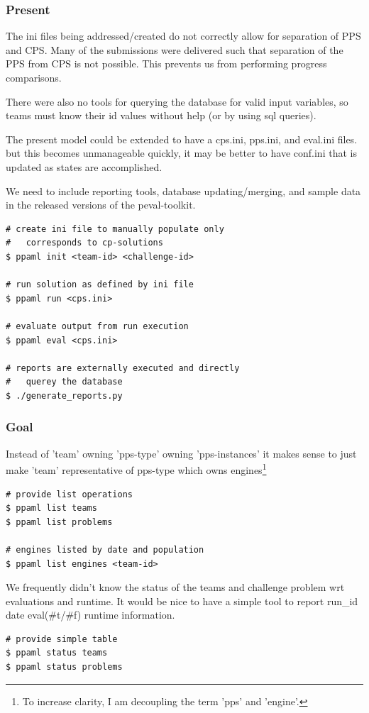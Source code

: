 \documentclass[11pt]{article} %
\def\ptk{peval-toolkit\xspace}
\begin{document}
\begin{multicols}{2}
  \subsubsection*{Present}
  The ini files being addressed/created do not correctly allow for separation of PPS and CPS. Many of the submissions were delivered such that separation of the PPS from CPS is not possible. This prevents us from performing progress comparisons.

  There were also no tools for querying the database for valid input variables, so teams must know their id values without help (or by using sql queries).

  
  The present model could be extended to have a cps.ini, pps.ini, and eval.ini files. but this becomes unmanageable quickly, it may be better to have conf.ini that is updated as states are accomplished.  

  We need to include reporting tools, database updating/merging, and sample data in the released versions of the \ptk.
  
  \begin{lstlisting}
# create ini file to manually populate only
#   corresponds to cp-solutions
$ ppaml init <team-id> <challenge-id> 

# run solution as defined by ini file
$ ppaml run <cps.ini>

# evaluate output from run execution
$ ppaml eval <cps.ini>

# reports are externally executed and directly 
#   querey the database
$ ./generate_reports.py 
  \end{lstlisting}
  
  \vfill\columnbreak
  \subsubsection*{Goal}
  Instead of 'team' owning 'pps-type' owning 'pps-instances' it makes sense to just make 'team' representative of pps-type which owns engines\footnote{To increase clarity, I am decoupling the term 'pps' and 'engine'.}
  \begin{lstlisting}
# provide list operations
$ ppaml list teams
$ ppaml list problems

# engines listed by date and population
$ ppaml list engines <team-id> 
  \end{lstlisting}
  We frequently didn't know the status of the teams and challenge problem wrt evaluations and runtime. It would be nice to have a simple  tool to report run\_id date eval(\#t/\#f) runtime information.
  \begin{lstlisting}
# provide simple table
$ ppaml status teams
$ ppaml status problems
  \end{lstlisting}


\end{multicols}
\end{document}
